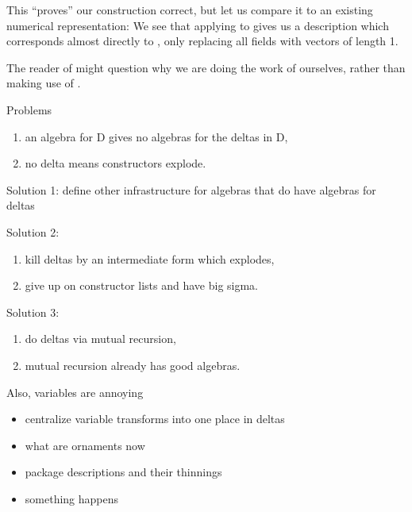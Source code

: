 \begin{example}
    
\end{example}
This ``proves'' our construction correct, but let us compare it to an existing numerical representation:
We see that applying  to  gives us a description which corresponds almost directly to , only replacing all fields with vectors of length 1.

The reader of \cite{algorn} might question why we are doing the work of  ourselves, rather than making use of .
\begin{remark}
Problems
\begin{enumerate}
    \item an algebra for D gives no algebras for the deltas in D,
    \item no delta means constructors explode.
\end{enumerate}

Solution 1: define other infrastructure for algebras that do have algebras for deltas

Solution 2:
\begin{enumerate}
    \item kill deltas by an intermediate form which explodes,
    \item give up on constructor lists and have big sigma.
\end{enumerate}

Solution 3:
\begin{enumerate}
    \item do deltas via mutual recursion,
    \item mutual recursion already has good algebras.
\end{enumerate}

\end{remark} 

\begin{remark}
    Also, variables are annoying
    \begin{itemize}
        \item centralize variable transforms into one place in deltas
        \item what are ornaments now
    \end{itemize} 

    \begin{itemize}
        \item package descriptions and their thinnings
        \item something happens
    \end{itemize}
\end{remark}

